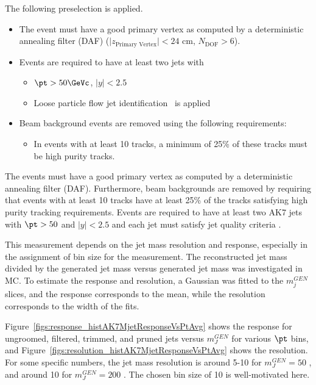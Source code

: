The following preselection is applied.
\ifnpas
\begin{itemize}

\item The event must have a good primary vertex as computed by a deterministic annealing filter (DAF)
($\vert z_\text{Primary Vertex}\vert < 24$ cm, $N_\text{DOF} > 6$).
\item Events are required to have at least two jets with
        \begin{itemize}
          \item $\pt > 50 \GeVc$, $|y| < 2.5$
        \item Loose particle flow jet identification~\cite{jetid} is applied
        \end{itemize}
\item Beam background events are removed using the following requirements:
        \begin{itemize}
        \item In events with at least 10 tracks, a minimum of 25\% of
          these tracks must be high purity tracks.
        \end{itemize}
\end{itemize}
\else
The events must have a good primary vertex as computed by a
deterministic annealing filter (DAF). Furthermore, beam backgrounds
are removed by requiring that events with at least 10 tracks 
have at least 25\% of the tracks satisfying high purity tracking
requirements.
Events are required to have at least two AK7 jets with
$\pt > 50$ \GeVc and $|y| < 2.5$
and each jet must satisfy jet quality criteria \cite{particleflow}. 
\fi


\ifnpas
This measurement depends on the jet mass resolution and response,
especially in the assignment of bin size for the measurement. 
The reconstructed jet mass divided by the generated jet mass
versus generated jet mass was investigated in \PYTHIA MC. To estimate
the response and resolution, a Gaussian was fitted to the $m_{j}^{GEN}$
slices, and the response corresponds to the mean, while the resolution
corresponds to the width of the fits. 

Figure~\ref{figs:response_histAK7MjetResponseVsPtAvg}
shows the response for ungroomed, filtered, trimmed, and pruned jets
versus $m_{J}^{GEN}$ for various $\pt$ bins, and 
Figure~\ref{figs:resolution_histAK7MjetResponseVsPtAvg}
shows the resolution. For some specific numbers, the jet mass resolution is
around 5-10 \GeVcc for $m_{J}^{GEN} = 50$ \GeVcc, and around 10 \GeVcc
for $m_{J}^{GEN} = 200$ \GeVcc. The chosen bin size of 10 \GeVcc is 
well-motivated here. 
\fi


